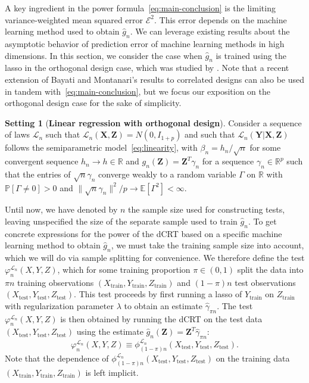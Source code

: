 \documentclass[ejs]{imsart}
\numberwithin{equation}{section}
\theoremstyle{plain}
\theoremstyle{definition}
\newtheorem{setting}{Setting}
\theoremstyle{remark}
\newcommand{\prx}{\bm X}
\newcommand{\srx}{X}
\newcommand{\prz}{\bm Z}
\newcommand{\srz}{Z}
\newcommand{\pry}{{\bm Y}}
\newcommand{\sry}{Y}
\begin{document}
A key ingredient in the power formula~\eqref{eq:main-conclusion} is the limiting variance-weighted mean squared error $\mathcal E^2$. This error depends on the machine learning method used to obtain $\widehat g_n$. We can leverage existing results about the asymptotic behavior of prediction error of machine learning methods in high dimensions. In this section, we consider the case when $\widehat g_n$ is trained using the lasso in the orthogonal design case, which was studied by \cite{Bayati2011}. Note that a recent extension of Bayati and Montanari's results to correlated designs \citep{Celentano2020} can also be used in tandem with~\eqref{eq:main-conclusion}, but we focus our exposition on the orthogonal design case for the sake of simplicity.

\begin{setting}[\bf Linear regression with orthogonal design] \label{setting:orthogonal-design}
Consider a sequence of laws $\mathcal L_n$ such that $\mathcal L_n(\prx, \prz) = N(0, I_{1+p})$ and such that $\mathcal L_n(\pry|\prx, \prz)$ follows the semiparametric model~\eqref{eq:linearity},  with $\beta_n = h_n/\sqrt{n}$ for some convergent sequence $h_n \rightarrow h \in \mathbb R$ and $g_n(\prz) = \prz^T \gamma_n$ for a sequence $\gamma_n \in \mathbb R^p$ such that the entries of $\sqrt n \gamma_n$ converge weakly to a random variable $\Gamma$ on $\mathbb R$ with $\mathbb P[\Gamma \neq 0] > 0$ and $\|\sqrt n \gamma_n\|^2/p \rightarrow \mathbb E[\Gamma^2] < \infty$.
\end{setting}

Until now, we have denoted by $n$ the sample size used for constructing tests, leaving unspecified the size of the separate sample used to train $\widehat g_n$. To get concrete expressions for the power of the dCRT based on a specific machine learning method to obtain $\widehat g_n$, we must take the training sample size into account, which we will do via sample splitting for convenience. We therefore define the test $\varphi_n^{\mathcal L_n}(\srx, \sry, \srz)$, which for some training proportion $\pi \in (0,1)$ split the data into $\pi n$ training observations $(\srx_{\text{train}}, \sry_{\text{train}}, \srz_{\text{train}})$ and $(1-\pi)n$ test observations $(\srx_{\text{test}}, \sry_{\text{test}}, \srz_{\text{test}})$. This test proceeds by first running a lasso of $\sry_{\text{train}}$ on $\srz_{\text{train}}$ with regularization parameter $\lambda$ to obtain an estimate $\widehat \gamma_{\pi n}$. The test $\varphi_n^{\mathcal L_n}(\srx, \sry, \srz)$ is then obtained by running the dCRT on the test data $(\srx_{\text{test}}, \sry_{\text{test}}, \srz_{\text{test}})$ using the estimate $\widehat g_n(\prz) = \prz^T \widehat \gamma_{\pi n}$:
\begin{equation*}
	\varphi_n^{\mathcal L_n}(\srx, \sry, \srz) \equiv \phi_{(1-\pi)n}^{\mathcal L_n}(\srx_{\text{test}}, \sry_{\text{test}}, \srz_{\text{test}}).
\end{equation*}
Note that the dependence of $\phi_{(1-\pi)n}^{\mathcal L_n}(\srx_{\text{test}}, \sry_{\text{test}}, \srz_{\text{test}})$ on the training data $(\srx_{\text{train}}, \sry_{\text{train}}, \srz_{\text{train}})$ is left implicit. 
\end{document}

